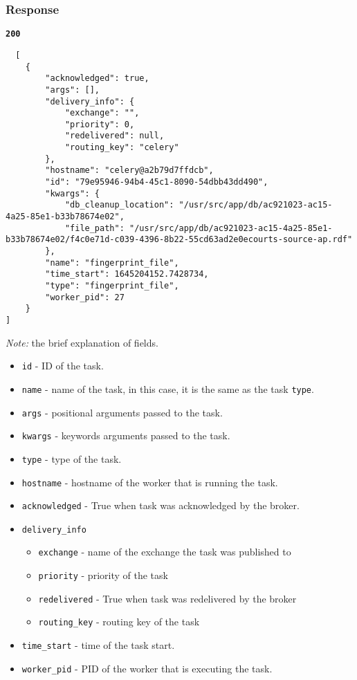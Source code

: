\subsubsection{Response}
\textbf{\texttt{200}}
\begin{lstlisting}
  [
    {
        "acknowledged": true,
        "args": [],
        "delivery_info": {
            "exchange": "",
            "priority": 0,
            "redelivered": null,
            "routing_key": "celery"
        },
        "hostname": "celery@a2b79d7ffdcb",
        "id": "79e95946-94b4-45c1-8090-54dbb43dd490",
        "kwargs": {
            "db_cleanup_location": "/usr/src/app/db/ac921023-ac15-4a25-85e1-b33b78674e02",
            "file_path": "/usr/src/app/db/ac921023-ac15-4a25-85e1-b33b78674e02/f4c0e71d-c039-4396-8b22-55cd63ad2e0ecourts-source-ap.rdf"
        },
        "name": "fingerprint_file",
        "time_start": 1645204152.7428734,
        "type": "fingerprint_file",
        "worker_pid": 27
    }
]
\end{lstlisting}

\textit{Note:} the brief explanation of fields.
\begin{itemize}
  \item \texttt{id} - ID of the task.
  \item \texttt{name} - name of the task, in this case, it is the same as the task \texttt{type}.
  \item \texttt{args} - positional arguments passed to the task.
  \item \texttt{kwargs} - keywords arguments passed to the task.
  \item \texttt{type} - type of the task.
  \item \texttt{hostname} - hostname of the worker that is running the task.
  \item \texttt{acknowledged} - True when task was acknowledged by the broker.
  \item \texttt{delivery\_info}
        \begin{itemize}
          \item \texttt{exchange} - name of the exchange the task was published to
          \item \texttt{priority} - priority of the task
          \item \texttt{redelivered} - True when task was redelivered by the broker
          \item \texttt{routing\_key} - routing key of the task
        \end{itemize}
  \item \texttt{time\_start} - time of the task start.
  \item \texttt{worker\_pid} - PID of the worker that is executing the task.
\end{itemize}

